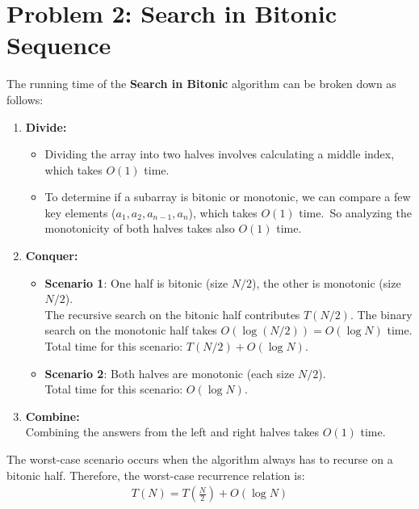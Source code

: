 \documentclass[11pt, a4paper, oneside]{memoir}
\begin{document}
\chapter{Problem 2: Search in Bitonic Sequence}
The running time of the \textbf{Search in Bitonic} algorithm can be broken down as follows:
\begin{enumerate}
    \item \textbf{Divide:}
          \begin{itemize}
              \item Dividing the array into two halves involves calculating a middle index, which takes $O(1)$ time.
              \item To determine if a subarray is bitonic or monotonic, we can compare a few key elements ($a_1, a_2, a_{n-1}, a_n$), which takes $O(1)$ time.\
                    So analyzing the monotonicity of both halves takes also $O(1)$ time.
          \end{itemize}
    \item \textbf{Conquer:}
          \begin{itemize}
              \item \textbf{Scenario 1}: One half is bitonic (size $N/2$), the other is monotonic (size $N/2$).\\
                    The recursive search on the bitonic half contributes $T(N/2)$.
                    The binary search on the monotonic half takes $O(\log(N/2)) = O(\log N)$ time.
                    Total time for this scenario: $T(N/2) + O(\log N)$.
              \item \textbf{Scenario 2}: Both halves are monotonic (each size $N/2$).\\
                    Total time for this scenario: $O(\log N)$.
          \end{itemize}
    \item \textbf{Combine:} \\
          Combining the answers from the left and right halves takes $O(1)$ time.
\end{enumerate}

The worst-case scenario occurs when the algorithm always has to recurse on a bitonic half. Therefore, the worst-case recurrence relation is:
\begin{align*}
    T(N) = T(\frac{N}{2}) + O(\log N)
\end{align*}
\end{document}
